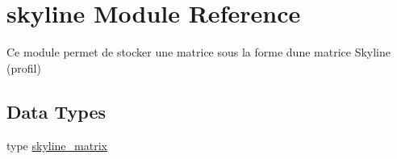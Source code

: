 \hypertarget{namespaceskyline}{}\section{skyline Module Reference}
\label{namespaceskyline}


Ce module permet de stocker une matrice sous la forme d\textquotesingle{}une matrice Skyline (profil)  


\subsection*{Data Types}
\begin{DoxyCompactItemize}
\item 
type \hyperlink{structskyline_1_1skyline__matrix}{skyline\+\_\+matrix}
\end{DoxyCompactItemize}
